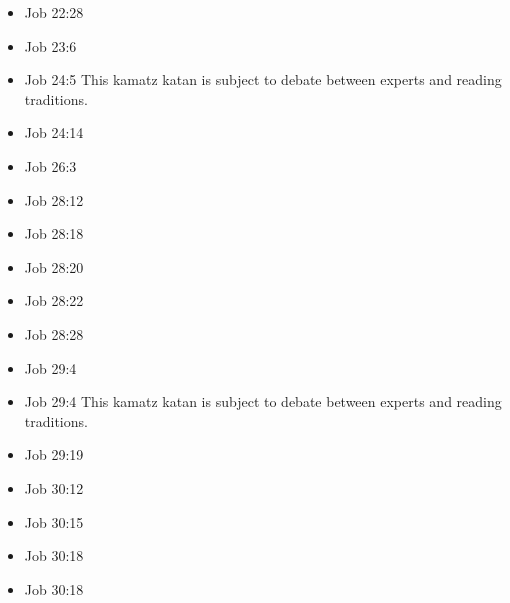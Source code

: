 \documentclass[14pt]{book}
\begin{document}
\begin{multicols}{2}
\begin{itemize}
															\item Job 22:28
															
															\item Job 23:6
															
															\item Job 24:5 This kamatz katan is subject to debate between experts and reading traditions.
															
															\item Job 24:14
															
															\item Job 26:3
															
															\item Job 28:12
															
															\item Job 28:18
															
															\item Job 28:20
															
															\item Job 28:22
															
															\item Job 28:28
															
															\item Job 29:4
															
															\item Job 29:4 This kamatz katan is subject to debate between experts and reading traditions.
															
															\item Job 29:19
															
															\item Job 30:12
															
															\item Job 30:15
															
															\item Job 30:18
															
															\item Job 30:18
															

\end{itemize}
\end{multicols}
\end{document}
